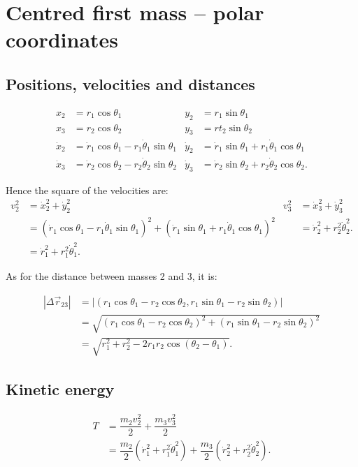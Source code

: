 \documentclass[12pt,a4paper,portrait]{article}
\begin{document}
	\section{Centred first mass -- polar coordinates}
	\subsection{Positions, velocities and distances}
	\begin{align*}
		x_2 &= r_1 \cos{\theta_1} & y_2 &= r_1 \sin{\theta_1}\\
		x_3 &= r_2 \cos{\theta_2} & y_3 &= rt_2 \sin{\theta_2} \\
		\dot{x}_2 &= \dot{r}_1 \cos{\theta_1} - r_1 \dot{\theta}_1 \sin{\theta_1} & \dot{y}_2 &= \dot{r}_1 \sin{\theta_1} + r_1 \dot{\theta}_1 \cos{\theta_1} \\
		\dot{x}_3 &= \dot{r}_2 \cos{\theta_2} - r_2 \dot{\theta}_2 \sin{\theta_2} & \dot{y}_3 &= \dot{r}_2 \sin{\theta_2} + r_2 \dot{\theta}_2 \cos{\theta_2}.
	\end{align*}
	
	Hence the square of the velocities are:
	\begin{align*}
		v_2^2 &= \dot{x}_2^2 + \dot{y}_2^2 & v_3^2 &= \dot{x}_3^2 + \dot{y}_3^2\\
		&= (\dot{r}_1 \cos{\theta_1} - r_1 \dot{\theta}_1 \sin{\theta_1})^2 + (\dot{r}_1 \sin{\theta_1} + r_1 \dot{\theta}_1 \cos{\theta_1})^2 & &= \dot{r}_2^2 + r_2^2 \dot{\theta}_2^2.\\
		&= \dot{r}_1^2 + r_1^2 \dot{\theta}_1^2.
	\end{align*}
	
	As for the distance between masses 2 and 3, it is:
	
	\begin{align*}
		\left|\Delta \vec{r}_{23}\right| &= \left|(r_1\cos{\theta_1} - r_2\cos{\theta_2}, r_1\sin{\theta_1} - r_2\sin{\theta_2})\right| \\
		&= \sqrt{(r_1\cos{\theta_1} - r_2\cos{\theta_2})^2+(r_1\sin{\theta_1} - r_2\sin{\theta_2})^2} \\
		&= \sqrt{r_1^2 + r_2^2 - 2r_1 r_2 \cos{(\theta_2-\theta_1)}}.
	\end{align*}
	
	\subsection{Kinetic energy}
	\begin{align*}
		T &= \dfrac{m_2v_2^2}{2}  + \dfrac{m_3v_3^2}{2} \\
		&= \dfrac{m_2}{2} (\dot{r}_1^2 + r_1^2 \dot{\theta}_1^2) + \dfrac{m_3}{2}(\dot{r}_2^2 + r_2^2 \dot{\theta}_2^2).
	\end{align*}
	
\end{document}
